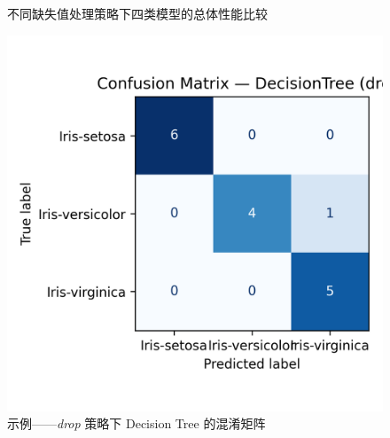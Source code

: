 \documentclass[UTF8]{ctexart}
\begin{document}
\begin{figure}[htbp]
    \centering
    \hfill
    \caption{不同缺失值处理策略下四类模型的总体性能比较}
    \label{fig:acc_f1_bar}
\end{figure}

\begin{figure}[htbp]
    \centering
    \includegraphics[width=0.48\linewidth]{figures/confmat_drop_DecisionTree.png}
    \caption{示例——\textit{drop} 策略下 Decision Tree 的混淆矩阵}
    \label{fig:confmat_drop_dt}
\end{figure}
\end{document}
